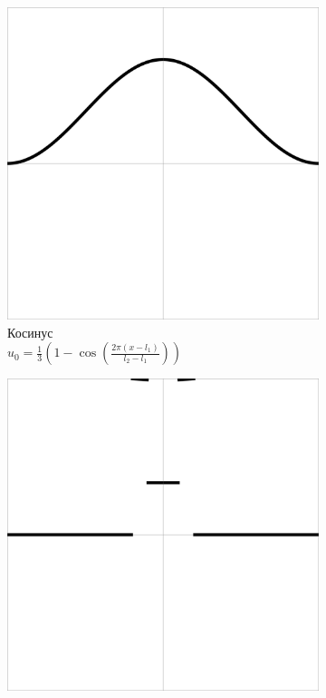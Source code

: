 \documentclass[12pt, a4paper]{article}
\begin{document}
\begin{figure}[!hp]
	\begin{subfigure}[t]{0.475\textwidth}
		\centering
		\includegraphics[width=\textwidth]{test4}
		\caption{Косинус \\ $u_0 = \frac{1}{3} (1 - \cos(\frac{2 \pi (x - l_1)}{l_2 - l_1}))$}
		\label{test4}
	\end{subfigure}
	\hfill
	\begin{subfigure}[t]{0.475\textwidth}
		\centering
		\includegraphics[width=\textwidth]{test5}

\end{subfigure}
\end{figure}
\end{document}
